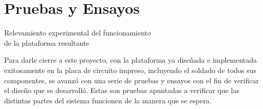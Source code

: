 \section{Pruebas y Ensayos} \label{ensayos}
\thispagestyle{plain}

\vspace{0.5cm}

\Large\scshape
\begin{center}
    {\Medium Relevamiento experimental del funcionamiento\\ de la plataforma resultante}
\end{center}
\normalfont

\divider

Para darle cierre a este proyecto, con la plataforma ya diseñada e implementada exitosamente en la placa de circuito impreso, incluyendo el soldado de todos sus componentes, se avanzó con una serie de pruebas y ensayos con el fin de verificar el diseño que se desarrolló. Estas son pruebas apuntadas a verificar que las distintas partes del sistema funcionen de la manera que se espera.\\

